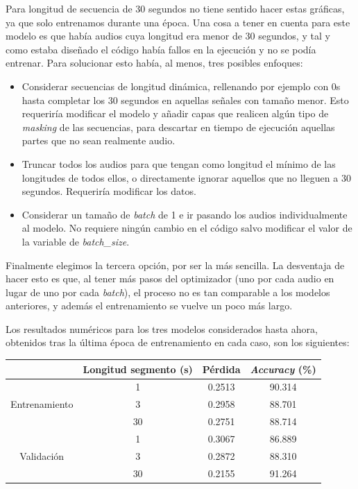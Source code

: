 \documentclass[11pt]{article}
\begin{document}
Para longitud de secuencia de 30 segundos no tiene sentido hacer estas gráficas, ya que solo entrenamos durante una época. Una cosa a tener en cuenta para este modelo es que había audios cuya longitud era menor de 30 segundos, y tal y como estaba diseñado el código había fallos en la ejecución y no se podía entrenar. Para solucionar esto había, al menos, tres posibles enfoques:
\begin{itemize}
  \item Considerar secuencias de longitud dinámica, rellenando por ejemplo con 0s hasta completar los 30 segundos en aquellas señales con tamaño menor. Esto requeriría modificar el modelo y añadir capas que realicen algún tipo de \textit{masking} de las secuencias, para descartar en tiempo de ejecución aquellas partes que no sean realmente audio.
  \item Truncar todos los audios para que tengan como longitud el mínimo de las longitudes de todos ellos, o directamente ignorar aquellos que no lleguen a 30 segundos. Requeriría modificar los datos.
  \item Considerar un tamaño de \textit{batch} de 1 e ir pasando los audios individualmente al modelo. No requiere ningún cambio en el código salvo modificar el valor de la variable de \textit{batch\_size}.
\end{itemize}

Finalmente elegimos la tercera opción, por ser la más sencilla. La desventaja de hacer esto es que, al tener más pasos del optimizador (uno por cada audio en lugar de uno por cada \textit{batch}), el proceso no es tan comparable a los modelos anteriores, y además el entrenamiento se vuelve un poco más largo.

Los resultados numéricos para los tres modelos considerados hasta ahora, obtenidos tras la última época de entrenamiento en cada caso, son los siguientes:

\begin{table}[h!]
  \centering
  \begin{tabular}{c|ccc}
      & Longitud segmento (s) & Pérdida & \textit{Accuracy} (\%)\\
    \hline
    \multirow{3}{*}{Entrenamiento} & 1 & 0.2513   & 90.314\\
    & 3 & 0.2958 & 88.701\\
    &30 & 0.2751  & 88.714\\\hline
    \multirow{3}{*}{Validación} & 1 & 0.3067 & 86.889\\
    &  3 & 0.2872 & 88.310\\
   &30 & 0.2155 & 91.264\\
  \end{tabular}
\end{table}
\end{document}
